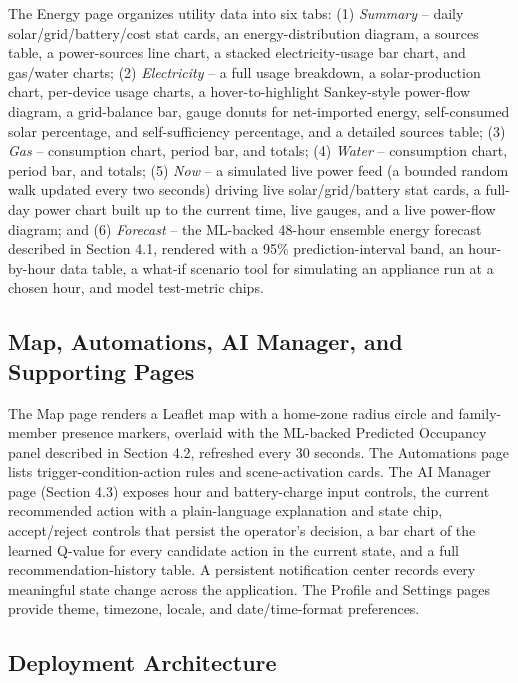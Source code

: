\documentclass[11pt,a4paper]{article}
\begin{document}
The Energy page organizes utility data into six tabs: (1) \emph{Summary} -- daily solar/grid/battery/cost stat cards, an energy-distribution diagram, a sources table, a power-sources line chart, a stacked electricity-usage bar chart, and gas/water charts; (2) \emph{Electricity} -- a full usage breakdown, a solar-production chart, per-device usage charts, a hover-to-highlight Sankey-style power-flow diagram, a grid-balance bar, gauge donuts for net-imported energy, self-consumed solar percentage, and self-sufficiency percentage, and a detailed sources table; (3) \emph{Gas} -- consumption chart, period bar, and totals; (4) \emph{Water} -- consumption chart, period bar, and totals; (5) \emph{Now} -- a simulated live power feed (a bounded random walk updated every two seconds) driving live solar/grid/battery stat cards, a full-day power chart built up to the current time, live gauges, and a live power-flow diagram; and (6) \emph{Forecast} -- the ML-backed 48-hour ensemble energy forecast described in Section 4.1, rendered with a 95\% prediction-interval band, an hour-by-hour data table, a what-if scenario tool for simulating an appliance run at a chosen hour, and model test-metric chips.

\subsection{Map, Automations, AI Manager, and Supporting Pages}

The Map page renders a Leaflet map with a home-zone radius circle and family-member presence markers, overlaid with the ML-backed Predicted Occupancy panel described in Section 4.2, refreshed every 30 seconds. The Automations page lists trigger-condition-action rules and scene-activation cards. The AI Manager page (Section 4.3) exposes hour and battery-charge input controls, the current recommended action with a plain-language explanation and state chip, accept/reject controls that persist the operator's decision, a bar chart of the learned Q-value for every candidate action in the current state, and a full recommendation-history table. A persistent notification center records every meaningful state change across the application. The Profile and Settings pages provide theme, timezone, locale, and date/time-format preferences.

\subsection{Deployment Architecture}
\end{document}
